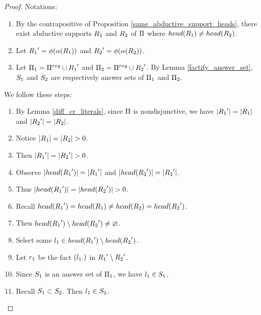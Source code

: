 \documentclass{paper}
\begin{document}
\begin{flushleft}
\begin{proof}
Notations:
\begin{enumerate}
\item
By the contrapositive of Proposition \ref{same_abductive_support_heads},
there exist abductive supports
${R}_{1}$ and ${R}_{2}$ of $\Pi$ where
$head({R}_{1}) \ne head({R}_{2})$.
\item
Let ${{R}_{1}}' = \phi(\alpha({R}_{1}))$ and
${{R}_{2}}' = \phi(\alpha({R}_{2}))$.
\item
Let ${\Pi}_{1} = \Pi^{reg} \cup {{R}_{1}}'$ and
${\Pi}_{2} = \Pi^{reg} \cup {{R}_{2}}'$.
By Lemma \ref{factify_answer_set},
${S}_{1}$ and ${S}_{2}$ are respectively answer sets of
${\Pi}_{1}$ and ${\Pi}_{2}$.
\end{enumerate}

We follow these steps:
\begin{enumerate}
\item
By Lemma \ref{diff_cr_literals},
since $\Pi$ is nondisjunctive, we have
$|{{R}_{1}}'| = |{R}_{1}|$ and
$|{{R}_{2}}'| = |{R}_{2}|$.
\item
Notice $|{R}_{1}| = |{R}_{2}| > 0$.
\item
Then $|{{R}_{1}}'| = |{{R}_{2}}'| > 0$.
\item
Observe $|head({{R}_{1}}')| = |{{R}_{1}}'|$ and
$|head({{R}_{2}}')| = |{{R}_{2}}'|$.
\item
Thus $|head({{R}_{1}}')| = |head({{R}_{2}}')| > 0$.
\item
Recall $head({{R}_{1}}') = head({R}_{1}) \ne
head({R}_{2}) = head({{R}_{2}}')$.
\item
Then $head({{R}_{1}}') \setminus head({{R}_{2}}') \ne
\varnothing$.
\item
Select some ${l}_{1} \in head({{R}_{1}}') \setminus
head({{R}_{2}}')$.
\item
Let ${r}_{1}$ be the fact $({l}_{1}.)$ in
${{R}_{1}}' \setminus{{R}_{2}}'$.
\item
Since ${S}_{1}$ is an answer set of ${\Pi}_{1}$, we have
${l}_{1} \in {S}_{1}$.
\item
Recall ${S}_{1} \subset {S}_{2}$.
Then ${l}_{1} \in {S}_{2}$.


\end{enumerate}
\end{proof}
\end{flushleft}
\end{document}
